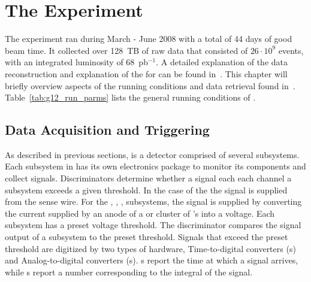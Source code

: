 \chapter{The  Experiment}\label{sec:clas.g12}

The  experiment ran during March - June 2008 with a total of 44 days of good beam time. It collected over 128~TB of raw data that consisted of $26\cdot 10^9$ events, with an integrated luminosity of 68~pb$^{-1}$. A detailed explanation of the  data reconstruction and explanation of the  for  can be found in~\cite{clas.g12.note}. This chapter will briefly overview aspects of the  running conditions and data retrieval found in~\cite{clas.g12.note}. Table~\ref{tab:g12_run_parms} lists the general running conditions of .

\newpage
\section{ Data Acquisition and Triggering  }\label{sec:clas.g12.conditions.data}

As described in previous sections, \clas is a detector comprised of several subsystems. Each subsystem in \clas has its own electronics package to monitor its components and collect signals. Discriminators determine whether a signal each each channel a subsystem exceeds a given threshold. In the case of the  the signal is supplied from the sense wire. For the , , ,  subsystems, the signal is supplied by converting the current supplied by an anode of a  or cluster of 's into a voltage. Each subsystem has a preset voltage threshold. The discriminator compares the signal output of a subsystem to the preset threshold. Signals that exceed the preset threshold are digitized by two types of hardware, Time-to-digital converters (s) and Analog-to-digital converters (s). s report the time at which a signal arrives, while s report a number corresponding to the integral of the signal.

